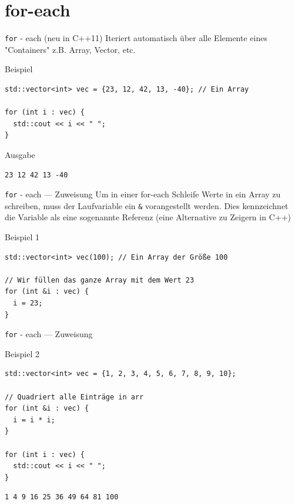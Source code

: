 \documentclass[presentation]{beamer}
\begin{document}
\section{for-each}
\label{sec:orgc90ddb7}
\begin{frame}[label={sec:org40d78e0},fragile]{{\color{solarizedYellow}\texttt{for}} - each (neu in C++11)}
 Iteriert automatisch über alle Elemente eines "Containers" z.B. Array,
Vector, etc.
\begin{block}{Beispiel}
\begin{verbatim}
std::vector<int> vec = {23, 12, 42, 13, -40}; // Ein Array

for (int i : vec) {
  std::cout << i << " ";
}
\end{verbatim}
\end{block}
\begin{block}{Ausgabe}
\begin{verbatim}
23 12 42 13 -40
\end{verbatim}
\end{block}
\end{frame}
\begin{frame}[label={sec:org7d08b55},fragile]{{\color{solarizedYellow}\texttt{for}} - each --- Zuweisung}
 Um in einer for-each Schleife Werte in ein Array zu schreiben, muss
der Laufvariable ein {\color{solarizedYellow}\verb!&!} vorangestellt werden. Dies kennzeichnet die
Variable als eine sogenannte \alert{Referenz} (eine Alternative zu Zeigern
in C++)
\begin{block}{Beispiel 1}
\begin{verbatim}
std::vector<int> vec(100); // Ein Array der Größe 100

// Wir füllen das ganze Array mit dem Wert 23
for (int &i : vec) {
  i = 23;
}
\end{verbatim}
\end{block}
\end{frame}
\begin{frame}[label={sec:orga0f7a65},fragile]{{\color{solarizedYellow}\texttt{for}} - each --- Zuweisung}
 \begin{block}{Beispiel 2}
\begin{verbatim}
std::vector<int> vec = {1, 2, 3, 4, 5, 6, 7, 8, 9, 10};

// Quadriert alle Einträge in arr
for (int &i : vec) {
  i = i * i;
}

for (int i : vec) {
  std::cout << i << " ";
}
\end{verbatim}

\begin{verbatim}
1 4 9 16 25 36 49 64 81 100
\end{verbatim}
\end{block}
\end{frame}
\end{document}
